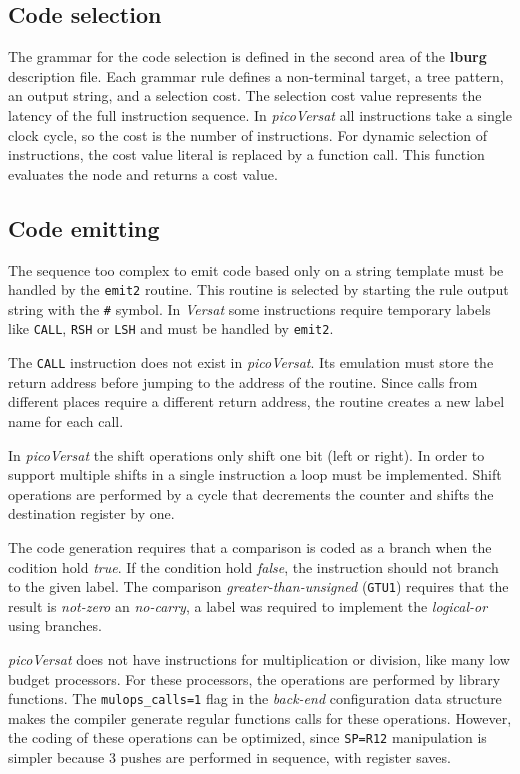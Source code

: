 \documentclass[journal]{IEEEtran}
\begin{document}
\subsection{Code selection}

The grammar for the code selection is defined in the second
area of the {\bf lburg} description file.
Each grammar rule defines a non-terminal target, a tree pattern,
an output string, and a selection cost.
The selection cost value represents the latency of the full
instruction sequence.
In {\it picoVersat} all instructions take a single clock cycle,
so the cost is the number of instructions.
For dynamic selection of instructions, the cost value literal
is replaced by a function call. This function evaluates the
node and returns a cost value.

\subsection{Code emitting}
The sequence too complex to emit code based only on a string template
must be handled by the {\tt emit2} routine.
This routine is selected by starting the rule output string with
the {\tt \#} symbol.
In {\it Versat} some instructions require temporary labels like
{\tt CALL}, {\tt RSH} or {\tt LSH} and must be handled by {\tt emit2}.

The {\tt CALL} instruction does not exist in {\it picoVersat}.
Its emulation must store the return address before
jumping to the address of the routine.
Since calls from different places require a different
return address, the routine creates a new label name for each call.

In {\it picoVersat} the shift operations only shift
one bit (left or right).
In order to support multiple shifts in a single
instruction a loop must be implemented.
Shift operations are performed by a cycle that decrements
the counter and shifts the destination register by one.

The code generation requires that a comparison is coded
as a branch when the codition hold {\em true}.
If the condition hold {\em false}, the instruction should
not branch to the given label.
The comparison {\em greater-than-unsigned} ({\tt GTU1})
requires that the result is {\em not-zero} an {\em no-carry},
a label was required to implement the {\em logical-or}
using branches.

{\it picoVersat} does not have instructions for
multiplication or division, like many low budget processors.
For these processors, the operations are performed by library
functions.
The {\tt mulops\_calls=1} flag in the {\it back-end} configuration
data structure makes the compiler generate regular functions
calls for these operations.
However, the coding of these operations can be optimized,
since {\tt SP=R12} manipulation is simpler because $3$
pushes are performed in sequence, with register saves.
\end{document}

